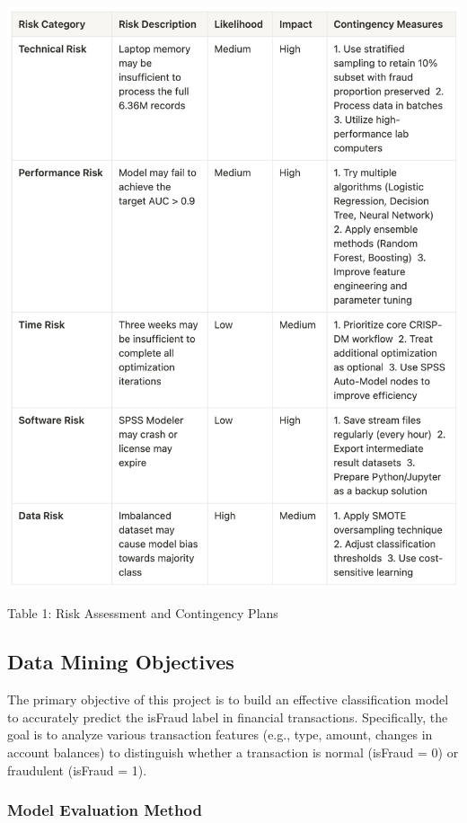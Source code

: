\documentclass[sigplan,screen]{acmart}
\begin{document}
\begin{center}
\includegraphics[width=0.9\columnwidth]{table1.jpg}
\vspace{0.2cm}

Table 1: Risk Assessment and Contingency Plans
\end{center}

\vspace{0.3cm}



\subsection{Data Mining Objectives}
    
    The primary objective of this project is to build an effective classification model to accurately predict the isFraud label in financial transactions. Specifically, the goal is to analyze various transaction features (e.g., type, amount, changes in account balances) to distinguish whether a transaction is normal (isFraud = 0) or fraudulent (isFraud = 1).
    
    \subsubsection{Model Evaluation Method}
    
\end{document}
